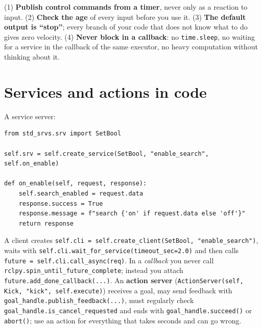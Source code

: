 \begin{keyidea}
(1) \textbf{Publish control commands from a timer}, never only as a reaction to input. (2) \textbf{Check the age} of every input before you use it. (3) \textbf{The default output is ``stop''}; every branch of your code that does not know what to do gives zero velocity. (4) \textbf{Never block in a callback}: no \verb!time.sleep!, no waiting for a service in the callback of the same executor, no heavy computation without thinking about it.
\end{keyidea}

\section*{Services and actions in code}
A service server:
\begin{verbatim}
from std_srvs.srv import SetBool

self.srv = self.create_service(SetBool, "enable_search", self.on_enable)

def on_enable(self, request, response):
    self.search_enabled = request.data
    response.success = True
    response.message = f"search {'on' if request.data else 'off'}"
    return response
\end{verbatim}
A client creates \verb!self.cli = self.create_client(SetBool, "enable_search")!, waits with \verb!self.cli.wait_for_service(timeout_sec=2.0)! and then calls \verb!future = self.cli.call_async(req)!. In a \emph{callback} you never call \verb!rclpy.spin_until_future_complete!; instead you attach \verb!future.add_done_callback(...)!. An \textbf{action server} (\verb!ActionServer(self, Kick, "kick", self.execute)!) receives a goal, may send feedback with \verb!goal_handle.publish_feedback(...)!, must regularly check \verb!goal_handle.is_cancel_requested! and ends with \verb!goal_handle.succeed()! or \verb!abort()!; use an action for everything that takes seconds and can go wrong.

